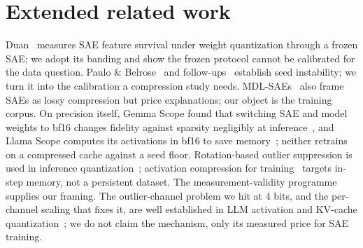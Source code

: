 \documentclass{article}
\begin{document}
\section{Extended related work}
\label{app:related}

Duan~\citep{duan} measures SAE feature survival under weight
quantization through a frozen SAE; we adopt its banding and show the
frozen protocol cannot be calibrated for the data question. Paulo \&
Belrose~\citep{paulo} and follow-ups~\citep{reprosubspaces} establish
seed instability; we turn it into the calibration a compression study
needs. MDL-SAEs~\citep{mdlsae} also frame SAEs as lossy compression
but price explanations; our object is the training corpus.
On precision itself, Gemma Scope found that switching SAE and model
weights to bf16 changes fidelity against sparsity negligibly at
inference~\citep{gemmascope}, and Llama Scope computes its activations
in bf16 to save memory~\citep{llamascope}; neither retrains on a
compressed cache against a seed floor.
Rotation-based outlier suppression is used in inference
quantization~\citep{quarot}; activation compression for
training~\citep{actnn} targets in-step memory, not a persistent
dataset. The measurement-validity
programme~\citep{proxypresumption,validitythreats,nlgmeasurement}
supplies our framing. The outlier-channel problem we hit at 4 bits, and the per-channel scaling that fixes it, are well established in LLM activation and KV-cache quantization~\citep{llmint8,smoothquant,kivi}; we do not claim the mechanism, only its measured price for SAE training.
\end{document}
